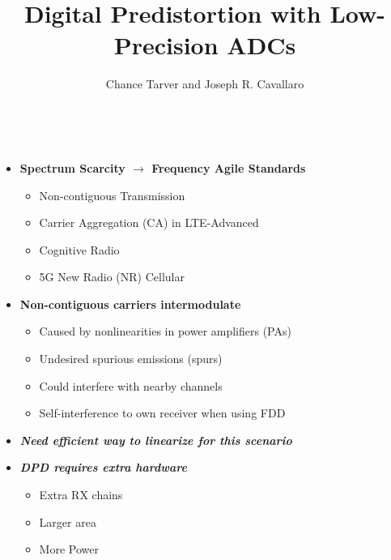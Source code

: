 \documentclass[25pt]{tikzposter} %
\title{\bf Digital Predistortion with Low-Precision ADCs}
\institute{Rice University} %
\author{Chance Tarver and Joseph R. Cavallaro}
\begin{document}
\maketitle %

\begin{columns} %
	\centering
	{    \Large
		\begin{itemize}
			\item {\bf Spectrum Scarcity $\rightarrow$ Frequency Agile Standards}
			      \begin{itemize}
				      \item Non-contiguous Transmission
				      \item Carrier Aggregation (CA) in LTE-Advanced
				      \item Cognitive Radio
				      \item 5G New Radio (NR) Cellular
			      \end{itemize}
			\item {\bf Non-contiguous carriers intermodulate}
			      \begin{itemize}
				      \item Caused by nonlinearities in power amplifiers (PAs)
				      \item Undesired spurious emissions (spurs)
				      \item Could interfere with nearby channels
				      \item Self-interference to own receiver when using FDD
			      \end{itemize}
			\item{\textbf{\textit{ Need efficient way to linearize for this scenario}}}
			\item{\textbf{\textit{ DPD requires extra hardware}}}
			      \begin{itemize}
				      \item Extra RX chains
				      \item Larger area
				      \item More Power

\end{itemize}
\end{itemize}}
\end{columns}
\end{document}
